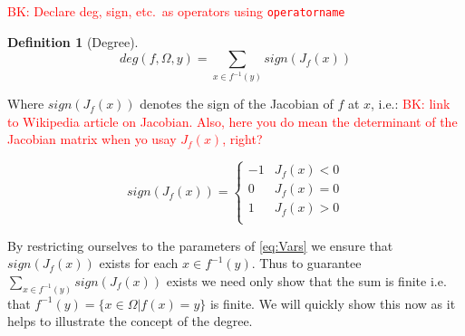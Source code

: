 \documentclass[11pt]{article}
\theoremstyle{plain}
\theoremstyle{definition}
\newtheorem{cdef}{Definition}[section]
\theoremstyle{remark}
\newcommand{\delete}[1]{\textcolor{red}{#1}}
\begin{document}
\delete{BK: Declare deg, sign, etc.~as operators using \texttt{operatorname}}
\begin{cdef}[Degree] \ \\
$$deg\left(f,\Omega,y\right)=\sum\limits_{x\in f^{-1}(y)}sign\left(J_f(x)\right)$$
\end{cdef}

Where $sign\left(J_f(x)\right)$ denotes the sign of the Jacobian of $f$ at $x$, i.e.:
\delete{BK: link to Wikipedia article on Jacobian. Also, here you do mean the determinant of the Jacobian matrix when yo usay $J_f(x)$, right?}

\[sign\left(J_f(x)\right)=   \left\{
\begin{array}{ll}
      -1 & J_f(x)< 0 \\
      0 & J_f(x)= 0 \\
      1 & J_f(x)> 0 \\
\end{array} 
\right. \]

By restricting ourselves to the parameters of \eqref{eq:Vars} we ensure that $sign\left(J_f(x)\right)$ exists for each $x\in f^{-1}(y)$. Thus to guarantee $\sum\limits_{x\in f^{-1}(y)}sign\left(J_f(x)\right)$ exists we need only show that the sum is finite i.e. that  $f^{-1}(y)=\{x\in\Omega|f(x)=y\}$ is finite. We will quickly show this now as it helps to illustrate the concept of the degree. 
\end{document}
